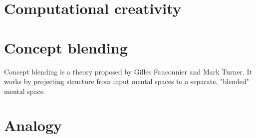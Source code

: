 
\section{Computational creativity}



\section{Concept blending}
Concept blending is a theory proposed by Gilles Fauconnier and Mark Turner. It works by projecting structure from input mental spaces to a separate, "blended" mental space. \parencite{reference3}


\section{Analogy}







